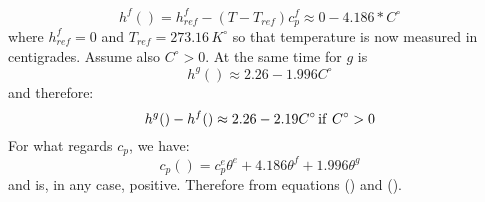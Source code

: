 \begin{equation}
h^f() = h^f_{ref} -(T-T_{ref})c_p^f \approx 0 - 4.186*  C^\circ   
\end{equation}
where \(h_{ref}^f=0\) and \(T_{ref} = 273.16\, K^\circ\) so that temperature is now measured in centigrades. Assume also \(C^\circ >0 \).
At the same time for \(g\) is 
\begin{equation}
h^g( ) \approx 2.26  - 1.996 C^\circ
\end{equation}
and therefore:
\begin{equation}
h^g()-h^f() \approx 2.26 - 2.19 C^\circ \, {\rm if}\ C^\circ > 0
\end{equation}
For what regards \( c_p\), we have:
\begin{equation}
c_p() = c_p^e \theta^e + 4.186 \theta^f + 1.996 \theta^g
\end{equation}
and is, in any case, positive.
Therefore from equations () and (). 